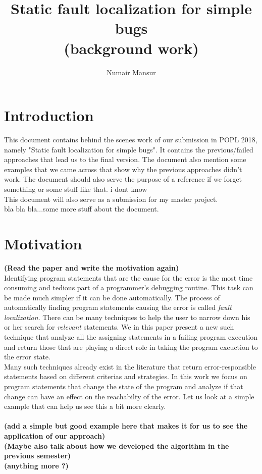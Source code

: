\documentclass{article}
\title{Static fault localization for simple bugs \\ \normalsize{(background work)}}
\author{Numair Mansur}
\affil{University of Freiburg, Germany}
\date{\vspace{-5ex}}
\begin{document}
\maketitle
\section{Introduction}
This document contains behind the scenes work of our submission in POPL 2018, namely "Static fault localization for simple bugs". It contains the previous/failed approaches that lead us to the final version. The document also mention some examples that we came across that show why the previous approaches didn't work. The document should also serve the purpose of  a reference if we forget something or some stuff like that. i dont know \\
This document will also serve as a submission for my master project. \\
bla bla bla...some more stuff about the document.
\section{Motivation}
\textbf{(Read the paper and write the motivation again)} \\
Identifying program statements that are the cause for the error is the most time consuming and tedious part of a programmer's debugging routine. This task can be made much simpler if it can be done automatically. The process of automatically finding program statements causing the error is called \textit{fault localization}. There can be many techniques to help the user to narrow down his or her search for \textit{relevant} statements. We in this paper present a new such technique that analyze all the assigning statements in a failing program execution and return those that are playing a direct role in taking the program exeuction to the error state.\\
Many such techniques already exist in the literature that return error-responsible statements based on different criterias and strategies. In this work we focus on program statements that change the state of the program and analyze if that change can have an effect on the reachabilty of the error. Let us look at a simple example that can help us see this a bit more clearly.\\
\\ \textbf{(add a simple but good example here that makes it for us to see the application of our approach)}
\\ \textbf{(Maybe also talk about how we developed the algorithm in the previous semester)}
\\ \textbf{(anything more ?)}
\end{document}

